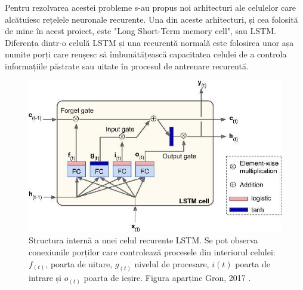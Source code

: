 \documentclass[a4paper,12pt]{book}
\begin{document}
				Pentru rezolvarea acestei probleme s-au propus noi arhitecturi ale celulelor care alcătuiesc rețelele neuronale recurente. Una din aceste arhitecturi, și cea folosită de mine în acest proiect, este "Long Short-Term memory cell", sau LSTM. Diferența dintr-o celulă LSTM și una recurentă normală este folosirea unor așa numite porți care reușesc să îmbunătățească capacitatea celulei de a controla informațiile păstrate sau uitate în procesul de antrenare recurentă.
				
				\begin{figure}[h]
					\centering
					\includegraphics[scale=0.5]{lstm}
					\caption{Structura internă a unei celul recurente LSTM. Se pot observa conexiunile porților care controlează procesele din interiorul celulei: $f_{(t)}$, poarta de uitare, $g_{(t)}$ nivelul de procesare, $i{(t)}$ poarta de intrare și $o_{(t)}$ poarta de ieșire. Figura aparține Gron, 2017 \cite{hands}.}
					\label{fig:lstm}
				\end{figure} 
			
\end{document}
